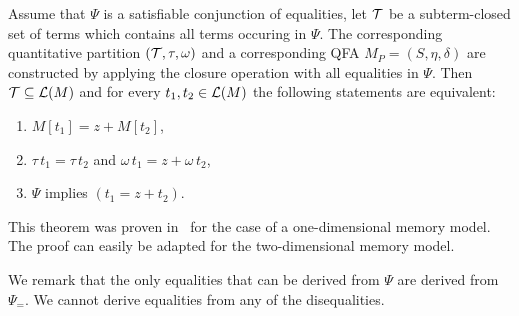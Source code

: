 
\begin{theorem}
  Assume that $\Psi$ is a satisfiable conjunction of equalities, let $\mathcal{T}$ be a subterm-closed set of terms which contains all terms occuring in $\Psi$.
  The corresponding quantitative partition $(\mathcal{T}, \tau,\omega)$ and a corresponding QFA $M_P = (S, \eta, \delta)$ are constructed by applying the closure operation with all equalities in $\Psi$.
  Then $\mathcal{T} \subseteq \mathcal{L}(M)$ and for every $t_1, t_2 \in \mathcal{L}(M)$ the following statements are equivalent:
  \begin{enumerate}
    \item $M[t_1] = z + M[t_2]$,
    \item $\tau\,t_1 = \tau\,t_2$ and $\omega\,t_1 = z + \omega\,t_2$,
    \item $\Psi$ implies $(t_1 = z + t_2)$.
  \end{enumerate}
\end{theorem}

This theorem was proven in~\cite{2pointer} for the case of a one-dimensional memory model.
The proof can easily be adapted for the two-dimensional memory model.

We remark that the only equalities that can be derived from $\Psi$ are derived from $\Psi_=$. We cannot derive equalities from any of the disequalities.
